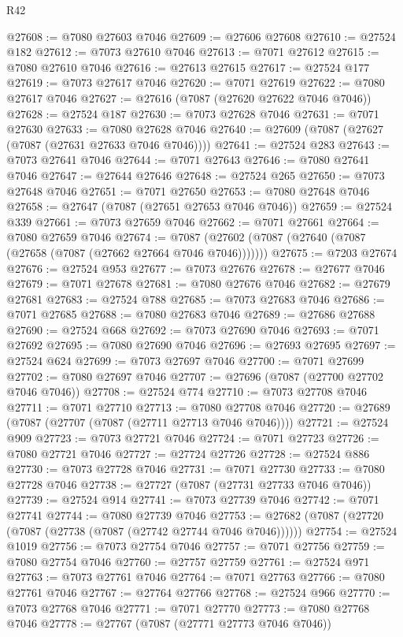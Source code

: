 \begin{lexlean}{R42}
\begin{coremodule}
{@27608 := @7080 @27603 @7046
@27609 := @27606 @27608
@27610 := @27524 @182
@27612 := @7073 @27610 @7046
@27613 := @7071 @27612
@27615 := @7080 @27610 @7046
@27616 := @27613 @27615
@27617 := @27524 @177
@27619 := @7073 @27617 @7046
@27620 := @7071 @27619
@27622 := @7080 @27617 @7046
@27627 := @27616 (@7087 (@27620 @27622 @7046 @7046))
@27628 := @27524 @187
@27630 := @7073 @27628 @7046
@27631 := @7071 @27630
@27633 := @7080 @27628 @7046
@27640 := @27609 (@7087 (@27627 (@7087 (@27631 @27633 @7046 @7046))))
@27641 := @27524 @283
@27643 := @7073 @27641 @7046
@27644 := @7071 @27643
@27646 := @7080 @27641 @7046
@27647 := @27644 @27646
@27648 := @27524 @265
@27650 := @7073 @27648 @7046
@27651 := @7071 @27650
@27653 := @7080 @27648 @7046
@27658 := @27647 (@7087 (@27651 @27653 @7046 @7046))
@27659 := @27524 @339
@27661 := @7073 @27659 @7046
@27662 := @7071 @27661
@27664 := @7080 @27659 @7046
@27674 := @7087 (@27602 (@7087 (@27640 (@7087 (@27658 (@7087 (@27662 @27664 @7046 @7046)))))))
@27675 := @7203 @27674
@27676 := @27524 @953
@27677 := @7073 @27676
@27678 := @27677 @7046
@27679 := @7071 @27678
@27681 := @7080 @27676 @7046
@27682 := @27679 @27681
@27683 := @27524 @788
@27685 := @7073 @27683 @7046
@27686 := @7071 @27685
@27688 := @7080 @27683 @7046
@27689 := @27686 @27688
@27690 := @27524 @668
@27692 := @7073 @27690 @7046
@27693 := @7071 @27692
@27695 := @7080 @27690 @7046
@27696 := @27693 @27695
@27697 := @27524 @624
@27699 := @7073 @27697 @7046
@27700 := @7071 @27699
@27702 := @7080 @27697 @7046
@27707 := @27696 (@7087 (@27700 @27702 @7046 @7046))
@27708 := @27524 @774
@27710 := @7073 @27708 @7046
@27711 := @7071 @27710
@27713 := @7080 @27708 @7046
@27720 := @27689 (@7087 (@27707 (@7087 (@27711 @27713 @7046 @7046))))
@27721 := @27524 @909
@27723 := @7073 @27721 @7046
@27724 := @7071 @27723
@27726 := @7080 @27721 @7046
@27727 := @27724 @27726
@27728 := @27524 @886
@27730 := @7073 @27728 @7046
@27731 := @7071 @27730
@27733 := @7080 @27728 @7046
@27738 := @27727 (@7087 (@27731 @27733 @7046 @7046))
@27739 := @27524 @914
@27741 := @7073 @27739 @7046
@27742 := @7071 @27741
@27744 := @7080 @27739 @7046
@27753 := @27682 (@7087 (@27720 (@7087 (@27738 (@7087 (@27742 @27744 @7046 @7046))))))
@27754 := @27524 @1019
@27756 := @7073 @27754 @7046
@27757 := @7071 @27756
@27759 := @7080 @27754 @7046
@27760 := @27757 @27759
@27761 := @27524 @971
@27763 := @7073 @27761 @7046
@27764 := @7071 @27763
@27766 := @7080 @27761 @7046
@27767 := @27764 @27766
@27768 := @27524 @966
@27770 := @7073 @27768 @7046
@27771 := @7071 @27770
@27773 := @7080 @27768 @7046
@27778 := @27767 (@7087 (@27771 @27773 @7046 @7046))
}
\end{coremodule}
\end{lexlean}
